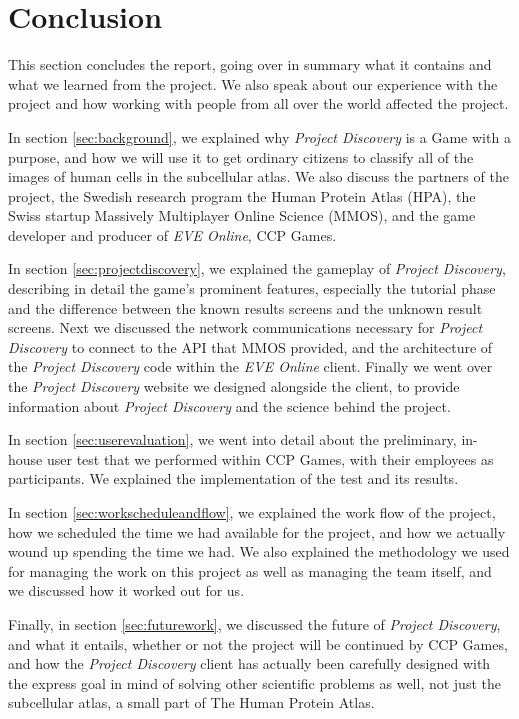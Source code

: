 \section{Conclusion}\label{sec:conclusion}

This section concludes the report, going over in summary what it contains and what we learned from the project. We also speak about our experience with the project and how working with people from all over the world affected the project. 

In section \ref{sec:background}, we explained why \emph{Project Discovery} is a Game with a purpose, and how we will use it to get ordinary citizens to classify all of the images of human cells in the subcellular atlas. We also discuss the partners of the project, the Swedish research program the Human Protein Atlas (HPA), the Swiss startup Massively Multiplayer Online Science (MMOS), and the game developer and producer of \emph{EVE Online}, CCP Games.

In section \ref{sec:projectdiscovery}, we explained the gameplay of \emph{Project Discovery}, describing in detail the game's prominent features, especially the tutorial phase and the difference between the known results screens and the unknown result screens. Next we discussed the network communications necessary for \emph{Project Discovery} to connect to the API that MMOS provided, and the architecture of the \emph{Project Discovery} code within the \emph{EVE Online} client. Finally we went over the \emph{Project Discovery} website we designed alongside the client, to provide information about \emph{Project Discovery} and the science behind the project.

In section \ref{sec:userevaluation}, we went into detail about the preliminary, in-house user test that we performed within CCP Games, with their employees as participants. We explained the implementation of the test and its results.

In section \ref{sec:workscheduleandflow}, we explained the work flow of the project, how we scheduled the time we had available for the project, and how we actually wound up spending the time we had. We also explained the methodology we used for managing the work on this project as well as managing the team itself, and we discussed how it worked out for us.

Finally, in section \ref{sec:futurework}, we discussed the future of \emph{Project Discovery}, and what it entails, whether or not the project will be continued by CCP Games, and how the \emph{Project Discovery} client has actually been carefully designed with the express goal in mind of solving other scientific problems as well, not just the subcellular atlas, a small part of The Human Protein Atlas.

